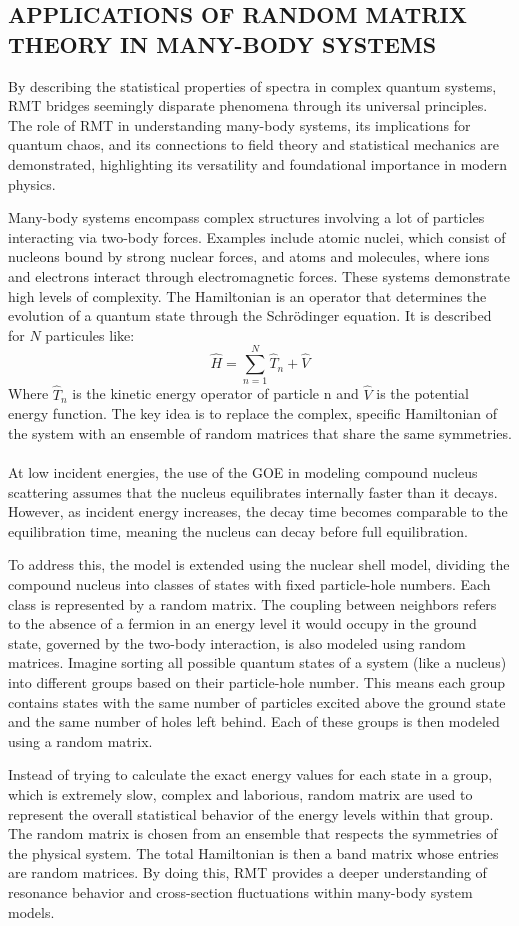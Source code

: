 \subsection{APPLICATIONS OF RANDOM MATRIX THEORY IN MANY-BODY SYSTEMS}\label{subsec:applications-of-random-matrix-theory-in-many-body-systems}

By describing the statistical properties of spectra in complex quantum systems, RMT bridges seemingly disparate phenomena through its universal principles.
The role of RMT in understanding many-body systems, its implications for quantum chaos, and its connections to field theory and statistical mechanics are demonstrated, highlighting its versatility and foundational importance in modern physics.

Many-body systems encompass complex structures involving a lot of particles interacting via two-body forces.
Examples include atomic nuclei, which consist of nucleons bound by strong nuclear forces, and atoms and molecules, where ions and electrons interact through electromagnetic forces.
These systems demonstrate high levels of complexity.
The Hamiltonian is an operator that determines the evolution of a quantum state through the Schrödinger equation.
It is described for $N$ particules like:
\[\hat{H}=\sum^N_{n=1}\hat{T}_n+\hat{V}\]
Where $\hat{T}_n$ is the kinetic energy operator of particle n and $\hat{V}$ is the potential energy function.
The key idea is to replace the complex, specific Hamiltonian of the system with an ensemble of random matrices that share the same symmetries.
\\\\
At low incident energies, the use of the GOE in modeling compound nucleus scattering assumes that the nucleus equilibrates internally faster than it decays.
However, as incident energy increases, the decay time becomes comparable to the equilibration time, meaning the nucleus can decay before full equilibration.

\noindent To address this, the model is extended using the nuclear shell model, dividing the compound nucleus into classes of states with fixed particle-hole numbers.
Each class is represented by a random matrix.
The coupling between neighbors refers to the absence of a fermion in an energy level it would occupy in the ground state, governed by the two-body interaction, is also modeled using random matrices.
Imagine sorting all possible quantum states of a system (like a nucleus) into different groups based on their particle-hole number.
This means each group contains states with the same number of particles excited above the ground state and the same number of holes left behind.
Each of these groups is then modeled using a random matrix.

Instead of trying to calculate the exact energy values for each state in a group, which is extremely slow, complex and laborious, random matrix are used to represent the overall statistical behavior of the energy levels within that group.
The random matrix is chosen from an ensemble that respects the symmetries of the physical system.
The total Hamiltonian is then a band matrix whose entries are random matrices.
By doing this, RMT provides a deeper understanding of resonance behavior and cross-section fluctuations within many-body system models.
